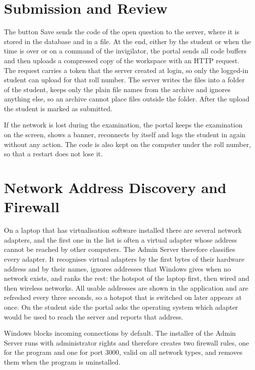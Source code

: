 \documentclass[12pt,a4paper]{report}
\begin{document}
\section{Submission and Review}
The button Save sends the code of the open question to the server, where it is stored in the database and in a file. At the end, either by the student or when the time is over or on a command of the invigilator, the portal sends all code buffers and then uploads a compressed copy of the workspace with an HTTP request. The request carries a token that the server created at login, so only the logged-in student can upload for that roll number. The server writes the files into a folder of the student, keeps only the plain file names from the archive and ignores anything else, so an archive cannot place files outside the folder. After the upload the student is marked as submitted.

If the network is lost during the examination, the portal keeps the examination on the screen, shows a banner, reconnects by itself and logs the student in again without any action. The code is also kept on the computer under the roll number, so that a restart does not lose it.

\section{Network Address Discovery and Firewall}
On a laptop that has virtualisation software installed there are several network adapters, and the first one in the list is often a virtual adapter whose address cannot be reached by other computers. The Admin Server therefore classifies every adapter. It recognises virtual adapters by the first bytes of their hardware address and by their names, ignores addresses that Windows gives when no network exists, and ranks the rest: the hotspot of the laptop first, then wired and then wireless networks. All usable addresses are shown in the application and are refreshed every three seconds, so a hotspot that is switched on later appears at once. On the student side the portal asks the operating system which adapter would be used to reach the server and reports that address.

Windows blocks incoming connections by default. The installer of the Admin Server runs with administrator rights and therefore creates two firewall rules, one for the program and one for port 3000, valid on all network types, and removes them when the program is uninstalled.
\end{document}
